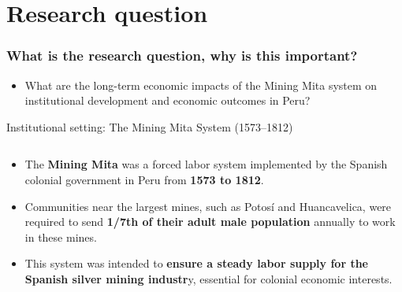\documentclass[notes,11pt, aspectratio=169]{beamer}
\begin{document}
\section{Research question}




\begin{frame}
  \frametitle{What is the research question, why is this important?}
  \begin{itemize}
    \item What are the long-term economic impacts of the Mining Mita system on institutional development and economic outcomes in Peru?
  \end{itemize}
  
\end{frame}


\begin{frame}{Institutional setting: The Mining Mita System (1573–1812)}
  \vspace{3pt}
\begin{columns}[T] %
\begin{column}{.58\textwidth}
\begin{minipage}[t][\textheight][t]
  {\dimexpr\textwidth}
 \vspace{8pt}
      \begin{itemize}
        \item The \textbf{Mining Mita} was a forced labor system implemented by the Spanish colonial government in Peru from \textbf{1573 to 1812}.
        \item Communities near the largest mines, such as Potosí and Huancavelica, were required to send \textbf{1/7th of their adult male population} annually to work in these mines.
        \item This system was intended to \textbf{ensure a steady labor supply for the Spanish silver mining industr}y, essential for colonial economic interests.
    \end{itemize}
    

\end{minipage}
\end{column}
\end{columns}
\end{frame}
\end{document}
